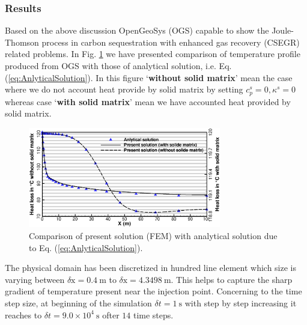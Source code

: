 \subsubsection*{\upshape\textbf{Results}}
Based on the above discussion OpenGeoSys (OGS) capable to show the Joule-Thomson process in carbon sequestration with enhanced gas recovery (CSEGR) related problems. In Fig. \ref{fig:JTComparison} we have presented comparison of temperature profile produced from OGS with those of analytical solution, i.e. Eq. (\ref{eq:AnlyticalSolution}). In this figure `\textbf{without solid matrix}' mean the case where we do not account heat provide by solid matrix by setting $c_p^s=0, \kappa^s=0$ whereas case `\textbf{with solid matrix}' mean we have accounted heat provided by solid matrix.
\begin{figure}[htb!]
\centering
\includegraphics[width=0.75\textwidth]{H_GAS/figures/JTCooling.eps}
\caption{Comparison of present solution (FEM) with analytical solution due to Eq. (\ref{eq:AnlyticalSolution}).}
\label{fig:JTComparison}
\end{figure}
The physical domain has been discretized in hundred line element which size is varying between $\delta {\mathrm x}=0.4~\mathrm m$ to $\delta {\mathrm x} = 4.3498~\mathrm m$. This helps to capture the sharp gradient of temperature present near the injection point. Concerning to the time step size, at beginning of the simulation $\delta t=1~\mathrm s$ with step by step increasing it reaches to $\delta t=9.0\times10^4~\mathrm s$ ofter $14$ time steps.


